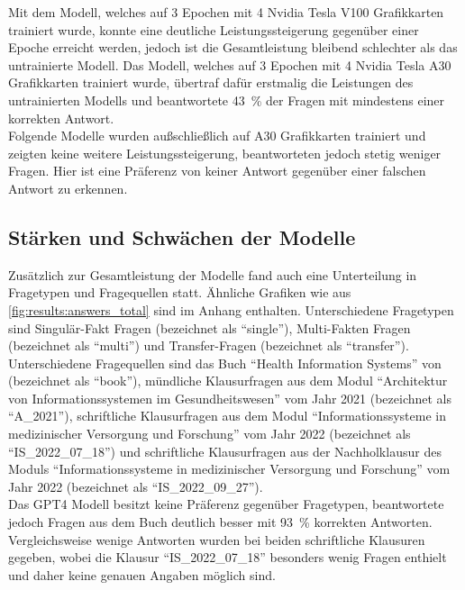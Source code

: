 Mit dem Modell, welches auf 3 Epochen mit 4 Nvidia Tesla V100 Grafikkarten trainiert wurde, konnte eine deutliche Leistungssteigerung gegenüber einer Epoche erreicht werden, jedoch ist die Gesamtleistung bleibend schlechter als das untrainierte Modell. Das Modell, welches auf 3 Epochen mit 4 Nvidia Tesla A30 Grafikkarten trainiert wurde, übertraf dafür erstmalig die Leistungen des untrainierten Modells und beantwortete \SI{43}{\percent} der Fragen mit mindestens einer korrekten Antwort.\\

Folgende Modelle wurden außschließlich auf A30 Grafikkarten trainiert und zeigten keine weitere Leistungssteigerung, beantworteten jedoch stetig weniger Fragen. Hier ist eine Präferenz von keiner Antwort gegenüber einer falschen Antwort zu erkennen.\\

\subsection{Stärken und Schwächen der Modelle}
Zusätzlich zur Gesamtleistung der Modelle fand auch eine Unterteilung in Fragetypen und Fragequellen statt.
Ähnliche Grafiken wie aus \cref{fig:results:answers_total} sind im Anhang enthalten.
Unterschiedene Fragetypen sind Singulär-Fakt Fragen (bezeichnet als \enquote{single}), Multi-Fakten Fragen (bezeichnet als \enquote{multi}) und Transfer-Fragen (bezeichnet als \enquote{transfer}). Unterschiedene Fragequellen sind das Buch \enquote{Health Information Systems} von \citet{bb} (bezeichnet als \enquote{book}), mündliche Klausurfragen aus dem Modul \enquote{Architektur von Informationssystemen im Gesundheitswesen} vom Jahr 2021 (bezeichnet als \enquote{A\_2021}), schriftliche Klausurfragen aus dem Modul \enquote{Informationssysteme in medizinischer Versorgung und Forschung} vom Jahr 2022 (bezeichnet als \enquote{IS\_2022\_07\_18}) und schriftliche Klausurfragen aus der Nachholklausur des Moduls \enquote{Informationssysteme in medizinischer Versorgung und Forschung} vom Jahr 2022 (bezeichnet als \enquote{IS\_2022\_09\_27}).\\

Das GPT4 Modell besitzt keine Präferenz gegenüber Fragetypen, beantwortete jedoch Fragen aus dem Buch deutlich besser mit \SI{93}{\percent} korrekten Antworten.
Vergleichsweise wenige Antworten wurden bei beiden schriftliche Klausuren gegeben, wobei die Klausur \enquote{IS\_2022\_07\_18} besonders wenig Fragen enthielt und daher keine genauen Angaben möglich sind.\\

